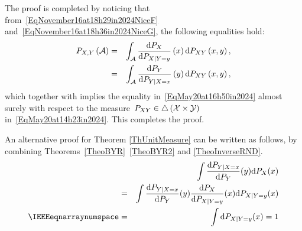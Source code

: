 \documentclass[lettersize,onecolumn]{IEEEtran}
\begin{document}
\begin{IEEEproof}
The proof is completed by noticing that from~\eqref{EqNovember16at18h29in2024NiceF} and~\eqref{EqNovember16at18h36in2024NiceG}, the following equalities hold:
%
\begin{eqnarray}
P_{X, Y }\left( \set{A} \right) \middlesqueezeequ & = &\int_{\set{A}} \frac{\mathrm{d}P_{X}}{\mathrm{d}P_{X | Y = y}} \left( x \right)    \mathrm{d}P_{XY} \left( x, y\right),  \\ 
& = & \int_{\set{A}}   \frac{\mathrm{d}P_{Y}}{\mathrm{d}P_{Y | X = x}} \left( y \right) \mathrm{d}P_{XY}  \left(x,y\right),
\end{eqnarray}
which together with \cite[Theorem~$2.2.3$]{lehmann2005testing} implies the equality in~\eqref{EqMay20at16h50in2024} almost surely with respect to the measure~$P_{XY} \in \triangle\left(\mathcal X \times \mathcal Y \right)$ in~\eqref{EqMay20at14h23in2024}. This completes the proof.

\end{IEEEproof}

\begin{remark}
An alternative proof for Theorem \ref {ThUnitMeasure} can be written as follows, by combining Theorems~\ref{TheoBYR}~\ref{TheoBYR2} and \ref{TheoInverseRND}.
\begin{eqnarray}
&& \int  \frac{\mathrm{d} P_{Y|X = x}}{\mathrm{d}P_{Y}} (y) \mathrm{d}P_{X}(x)\\
 &=& \int  \frac{\mathrm{d} P_{Y|X = x}}{\mathrm{d}P_{Y}} (y)\frac{\mathrm{d} P_{X}}{\mathrm{d}P_{X | Y= y}} (x) \mathrm{d}P_{X|Y = y}(x)\\\squeezeequ\spnum
 &=&  \int  \mathrm{d}P_{X|Y = y}(x) = 1
 \end{eqnarray}

\end{remark}
\end{document}

